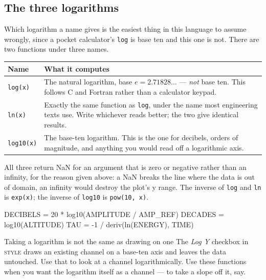 \documentclass[11pt,a4paper,oneside]{report}
\newcommand{\code}[1]{\texttt{#1}}
\newcommand{\tab}[1]{\textsc{#1}}
\begin{document}
\subsection{The three logarithms}

Which logarithm a name gives is the easiest thing in this language to assume
wrongly, since a pocket calculator's \code{log} is base ten and this one is not.
There are two functions under three names.

\begin{center}
\small
\begin{tabular}{@{}p{}p{}@{}}
\toprule
\textbf{Name} & \textbf{What it computes} \\
\midrule
\code{log(x)} & The natural logarithm, base $e = 2.71828\ldots$ --- \emph{not} base ten. This follows C and Fortran rather than a calculator keypad. \\
\addlinespace
\code{ln(x)} & Exactly the same function as \code{log}, under the name most engineering texts use. Write whichever reads better; the two give identical results. \\
\addlinespace
\code{log10(x)} & The base-ten logarithm. This is the one for decibels, orders of magnitude, and anything you would read off a logarithmic axis. \\
\bottomrule
\end{tabular}
\end{center}

All three return NaN for an argument that is zero or negative rather than an
infinity, for the reason given above: a NaN breaks the line where the data is out
of domain, an infinity would destroy the plot's y range. The inverse of
\code{log} and \code{ln} is \code{exp(x)}; the inverse of \code{log10} is
\code{pow(10, x)}.

\begin{aoecode}
DECIBELS = 20 * log10(AMPLITUDE / AMP_REF)
DECADES  = log10(ALTITUDE)
TAU      = -1 / deriv(ln(ENERGY), TIME)
\end{aoecode}

\begin{aoenote}{Taking a logarithm is not the same as drawing on one}
The \emph{Log Y} checkbox in \tab{style} draws an existing channel on a base-ten
axis and leaves the data untouched. Use that to look at a channel
logarithmically. Use these functions when you want the logarithm itself as a
channel --- to take a slope off it, say.
\end{aoenote}
\end{document}
